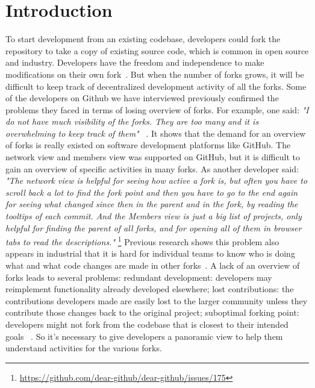 \section{Introduction}
To start development from an existing codebase, developers could fork the repository to take a copy of existing source code, which is common in open source and industry. Developers have the freedom and independence to make modifications on their own fork~\cite{dubinsky2013exploratory, bitzer2006impact, ernst2010code,vetter2007open}. But when the number of forks grows, it will be difficult to keep track of decentralized development activity of all the forks. Some of the developers on Github we have interviewed previously confirmed the problems they faced in terms of losing overview of forks. For example, one said: \emph{"I do not have much visibility of the forks. They are too many and it is overwhelming to keep track of them"} ~\cite{ZSLXWK:ICSE18}. It shows that the demand for an overview of forks is really existed on software development platforms like GitHub. The network view and members view was supported on GitHub, but it is difficult to gain an overview of specific activities in many forks. As another developer said: \emph{"The network view is helpful for seeing how active a fork is, but often you have to scroll back a lot to find the fork point and then you have to go to the end again for seeing what changed since then in the parent and in the fork, by reading the tooltips of each commit. And the Members view is just a big list of projects, only helpful for finding the parent of all forks, and for opening all of them in browser tabs to read the descriptions."} \footnote{\url{https://github.com/dear-github/dear-github/issues/175}}
Previous research shows this problem also appears in industrial that it is hard for individual teams to know who is doing what and what code changes are made in other forks~\cite{berger2014three,Duc:2014:FCM:2652524.2652546}. A lack of an overview of forks leads to several problems: redundant development: developers may reimplement functionality already developed elsewhere; lost contributions: the contributions developers made are easily lost to the larger community unless they contribute those changes back to the original project; suboptimal forking point: developers might not fork from the codebase that is closest to their intended goals ~\cite{dubinsky2013exploratory,stanciulescu2015forked}. So it's necessary to give developers a panoramic view to help them understand activities for the various forks.

